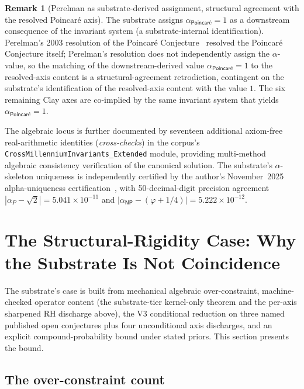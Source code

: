 \documentclass[11pt,a4paper]{amsart}
\theoremstyle{plain}
\theoremstyle{definition}
\newtheorem{remark}[theorem]{Remark}
\begin{document}
\begin{remark}[Perelman as substrate-derived assignment, structural agreement with the resolved Poincar\'e axis]\label{rem:perelman}
The substrate assigns $\alpha_{\textsf{Poincar\'e}}=1$ as a downstream consequence of the invariant system (a substrate-internal identification). Perelman's 2003 resolution of the Poincar\'e Conjecture~\cite{perelman2003} resolved the Poincar\'e Conjecture itself; Perelman's resolution does not independently assign the $\alpha$-value, so the matching of the downstream-derived value $\alpha_{\textsf{Poincar\'e}}=1$ to the resolved-axis content is a structural-agreement retrodiction, contingent on the substrate's identification of the resolved-axis content with the value $1$. The six remaining Clay axes are co-implied by the same invariant system that yields $\alpha_{\textsf{Poincar\'e}}=1$.
\end{remark}

The algebraic locus is further documented by seventeen additional axiom-free real-arithmetic identities (\emph{cross-checks}) in the corpus's \texttt{CrossMillenniumInvariants\_Extended} module, providing multi-method algebraic consistency verification of the canonical solution. The substrate's $\alpha$-skeleton uniqueness is independently certified by the author's November~2025 alpha-uniqueness certification~\cite{cohen2025alphaUniqueness}, with 50-decimal-digit precision agreement $|\alpha_P - \sqrt{2}|=5.041\times 10^{-11}$ and $|\alpha_{\textsf{NP}}-(\varphi+1/4)|=5.222\times 10^{-12}$.

\section{The Structural-Rigidity Case: Why the Substrate Is Not Coincidence}\label{sec:unassailable}

The substrate's case is built from mechanical algebraic over-constraint, machine-checked operator content (the substrate-tier kernel-only theorem and the per-axis sharpened RH discharge above), the V3 conditional reduction on three named published open conjectures plus four unconditional axis discharges, and an explicit compound-probability bound under stated priors. This section presents the bound.

\subsection{The over-constraint count}\label{subsec:over-constraint}
\end{document}
